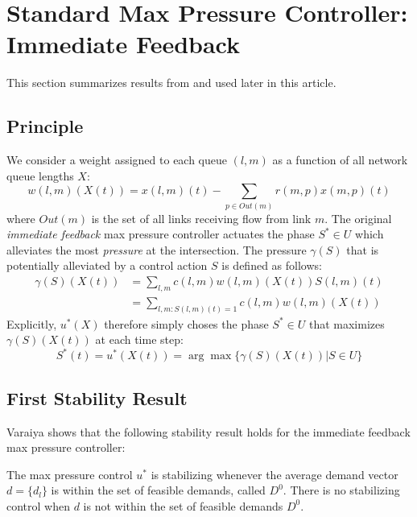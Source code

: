 \section{Standard Max Pressure Controller: Immediate Feedback} \label{sec:immediatefeedback}

This section summarizes results from \cite{MaxPressureStochastic} and \cite{MaxPressureOriginal} used later in this article.

\subsection*{Principle}

We consider a weight assigned to each queue $(l,m)$ as a function of all network queue lengths $X$:
\begin{equation} \label{linkweight}
w(l,m)(X(t))= x(l,m)(t) - \sum_{p \in Out(m)} r(m,p)x(m,p)(t)
\end{equation}
where $Out(m)$ is the set of all links receiving flow from link $m$. The original \emph{immediate feedback} max pressure controller actuates the phase $S^* \in U$ which alleviates the most \emph{pressure} at the intersection. The pressure $\gamma(S)$ that is potentially alleviated by a control action $S$ is defined as follows: 
\begin{align}
\gamma(S)(X(t)) &= \sum_{l,m}c(l,m)w(l,m)(X(t))S(l,m)(t) \\
&= \sum_{l,m: S(l,m)(t) = 1}c(l,m)w(l,m)(X(t))
\end{align}
Explicitly, $u^{*}(X)$ therefore simply choses the phase $S^*\in U$ that maximizes $\gamma(S)(X(t))$ at each time step:
\begin{equation} \label{original_MP}
S^*(t)  = u^{*}(X(t)) = \arg\max\{\gamma(S)(X(t)) \vert S \in U\} 
\end{equation}



\subsection*{First Stability Result}

Varaiya \cite{MaxPressureStochastic} shows that the following stability result holds for the immediate feedback max pressure controller:
\begin{Thm}\label{StabMP}
The max pressure control $u^{*}$ is stabilizing whenever the average demand vector $d = \lbrace d_{l}\rbrace$ is within the set of feasible demands, called $D^0$.
There is no stabilizing control when $d$ is not within the set of feasible demands $D^{0}$.
\end{Thm}

